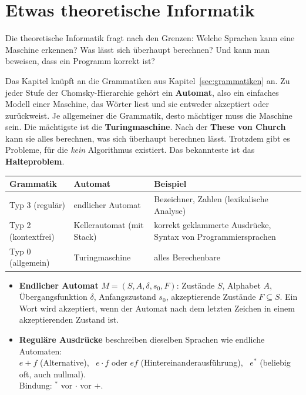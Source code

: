 \section{Etwas theoretische Informatik}
\worum
Die theoretische Informatik fragt nach den Grenzen: Welche Sprachen kann eine Maschine erkennen? Was lässt sich überhaupt berechnen? Und kann man beweisen, dass ein Programm korrekt ist?

Das Kapitel knüpft an die Grammatiken aus Kapitel~\ref{sec:grammatiken} an. Zu jeder Stufe der Chomsky-Hierarchie gehört ein \textbf{Automat}, also ein einfaches Modell einer Maschine, das Wörter liest und sie entweder akzeptiert oder zurückweist. Je allgemeiner die Grammatik, desto mächtiger muss die Maschine sein. Die mächtigste ist die \textbf{Turingmaschine}. Nach der \textbf{These von Church} kann sie alles berechnen, was sich überhaupt berechnen lässt. Trotzdem gibt es Probleme, für die \emph{kein} Algorithmus existiert. Das bekannteste ist das \textbf{Halteproblem}.

\begin{merke}
\begin{center}
\begin{tabular}{@{}llL{6.4cm}@{}}
\toprule
\textbf{Grammatik} & \textbf{Automat} & \textbf{Beispiel} \\
\midrule
Typ 3 (regulär) & endlicher Automat & Bezeichner, Zahlen (lexikalische Analyse) \\
Typ 2 (kontextfrei) & Kellerautomat (mit Stack) & korrekt geklammerte Ausdrücke, Syntax von Programmiersprachen \\
Typ 0 (allgemein) & Turingmaschine & alles Berechenbare \\
\bottomrule
\end{tabular}
\end{center}
\begin{itemize}[itemsep=0.1em]
\item \textbf{Endlicher Automat} $M = (S, A, \delta, s_0, F)$: Zustände $S$, Alphabet $A$, Übergangsfunktion $\delta$, Anfangszustand $s_0$, akzeptierende Zustände $F \subseteq S$. Ein Wort wird akzeptiert, wenn der Automat nach dem letzten Zeichen in einem akzeptierenden Zustand ist.
\item \textbf{Reguläre Ausdrücke} beschreiben dieselben Sprachen wie endliche Automaten: \\
$e + f$ (Alternative), \ $e \cdot f$ oder $ef$ (Hintereinanderausführung), \ $e^*$ (beliebig oft, auch nullmal). \\
Bindung: $^*$ vor $\cdot$ vor $+$.
\end{itemize}
\end{merke}

